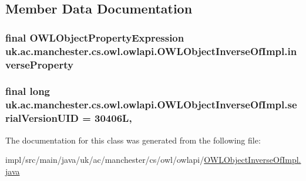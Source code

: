 \subsection{Member Data Documentation}
\hypertarget{classuk_1_1ac_1_1manchester_1_1cs_1_1owl_1_1owlapi_1_1_o_w_l_object_inverse_of_impl_a868093c9a0f349a17a51723a89b39080}{
\subsubsection[{inverse\-Property}]{\setlength{\rightskip}{0pt plus 5cm}final {\bf O\-W\-L\-Object\-Property\-Expression} uk.\-ac.\-manchester.\-cs.\-owl.\-owlapi.\-O\-W\-L\-Object\-Inverse\-Of\-Impl.\-inverse\-Property\hspace{0.3cm}{\ttfamily [private]}}}\label{classuk_1_1ac_1_1manchester_1_1cs_1_1owl_1_1owlapi_1_1_o_w_l_object_inverse_of_impl_a868093c9a0f349a17a51723a89b39080}
\hypertarget{classuk_1_1ac_1_1manchester_1_1cs_1_1owl_1_1owlapi_1_1_o_w_l_object_inverse_of_impl_a2d5cb677b52375a5f57add2654960e94}{
\subsubsection[{serial\-Version\-U\-I\-D}]{\setlength{\rightskip}{0pt plus 5cm}final long uk.\-ac.\-manchester.\-cs.\-owl.\-owlapi.\-O\-W\-L\-Object\-Inverse\-Of\-Impl.\-serial\-Version\-U\-I\-D = 30406\-L\hspace{0.3cm}{\ttfamily [static]}, {\ttfamily [private]}}}\label{classuk_1_1ac_1_1manchester_1_1cs_1_1owl_1_1owlapi_1_1_o_w_l_object_inverse_of_impl_a2d5cb677b52375a5f57add2654960e94}


The documentation for this class was generated from the following file\-:\begin{DoxyCompactItemize}
\item 
impl/src/main/java/uk/ac/manchester/cs/owl/owlapi/\hyperlink{_o_w_l_object_inverse_of_impl_8java}{O\-W\-L\-Object\-Inverse\-Of\-Impl.\-java}\end{DoxyCompactItemize}

